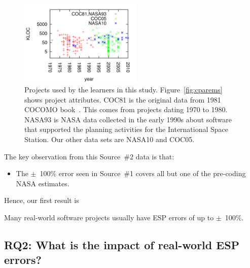 \documentclass[final,twocolumn]{elsarticle}
\newcommand{\bi}{\begin{itemize}[leftmargin=0.4cm]}
\newcommand{\ei}{\end{itemize}}
\newcommand{\fig}[1]{Figure~\ref{fig:#1}}
\theoremstyle{break}
\begin{document}
\begin{figure}[!b]
\begin{center}
\noindent\includegraphics[width=2.3in]{Figs/yearLOC.pdf}
\end{center}
\caption{Projects used by the learners in this study. \fig{cparems}
shows project attributes. 
COC81 is the original data from 1981 COCOMO book~\cite{boehm81}. 
This comes from projects dating 1970 to 1980.
NASA93 is NASA data collected  in the early 1990s
 about software that supported  the planning activities for the International
Space Station. 
Our other data sets are  NASA10 and COC05.
}\label{fig:types}
\end{figure}  

  The key observation from  this Source~\#2 data is that:
  \bi
\item The  $\pm$~100\% error seen in Source~\#1 covers all but one of the pre-coding
  NASA estimates. 
  \ei
  Hence, our first result is
  
\begin{lesson}
  Many real-world software projects usually have ESP errors of up to $\pm$~100\%.
\end{lesson}


 


\subsection{RQ2: What is the impact of real-world ESP errors?}\label{sect:rq2}
\end{document}
